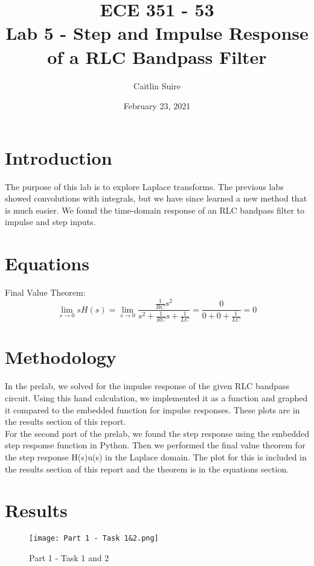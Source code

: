\documentclass[12pt]{report}
\title{\myfont \textbf{ ECE 351 - 53 \\ \bigskip Lab 5 - Step and Impulse Response of a RLC Bandpass Filter}}
\author{Caitlin Suire}
\date{February 23, 2021}
\begin{document}
\maketitle

\thispagestyle{empty}

\newpage

\tableofcontents
\pagebreak


\section{Introduction}
\noindent The purpose of this lab is to explore Laplace transforms. The previous labs showed convolutions with integrals, but we have since learned a new method that is much easier. We found the time-domain response of an RLC bandpass filter to impulse and step inputs. 

\section{Equations}
\noindent Final Value Theorem:
\[\lim_{s\to 0} sH(s) = \lim_{s\to 0} \frac{\frac{1}{RC}s^2}{s^2 + \frac{1}{RC}s + \frac{1}{LC}} = \frac{0}{0+0+\frac{1}{LC}} = 0\]

\section{Methodology}
\noindent In the prelab, we solved for the impulse response of the given RLC bandpass circuit. Using this hand calculation, we implemented it as a function and graphed it compared to the embedded function for impulse responses. These plots are in the results section of this report. \\

\noindent For the second part of the prelab, we found the step response using the embedded step response function in Python. Then we performed the final value theorem for the step response H(s)u(s) in the Laplace domain. The plot for this is included in the results section of this report and the theorem is in the equations section. 

\newpage 
\section{Results}
\begin{figure}[ht]
\begin{center}
\texttt{[image: Part 1 - Task 1\&2.png]}
\caption{Part 1 - Task 1 and 2}
\end{center}
\end{figure}
\clearpage
\end{document}
